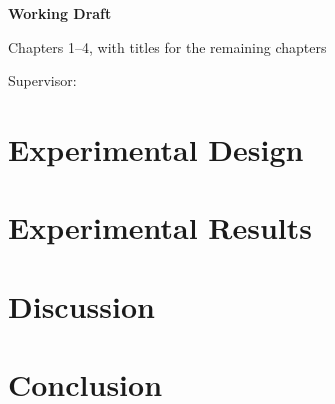 \documentclass[12pt,a4paper,oneside,openany]{book}
\begin{document}
\frontmatter
\begin{titlepage}
  \centering
  \vspace*{18mm}
  {\Large\bfseries \thesistitle\par}
  \vspace{18mm}
  {\Large\bfseries Working Draft\par}
  \vspace{4mm}
  {\large Chapters 1--4, with titles for the remaining chapters\par}
  \vspace{18mm}
  {\large \thesisauthor\par}
  \vfill
  {\large Supervisor: \thesissupervisor\par}
  \vspace{15mm}
  {\large \thesisschool\par}
  {\large \thesisuniversity\par}
  \vspace{15mm}
  {\large \thesisdate\par}
\end{titlepage}
\setcounter{page}{1}
\tableofcontents

\mainmatter





\chapter{Experimental Design}
\label{chap:design}

\chapter{Experimental Results}
\label{chap:results}
\setcounter{section}{6}
\label{sec:mechanism-results}

\chapter{Discussion}
\label{chap:discussion}

\chapter{Conclusion}
\label{chap:conclusion}

\appendix
{}
\label{app:derivation-details}
\label{app:construction}
\label{app:evidence-index}
\label{app:independence-boundary}
\label{app:reproducibility}

\backmatter


\end{document}
